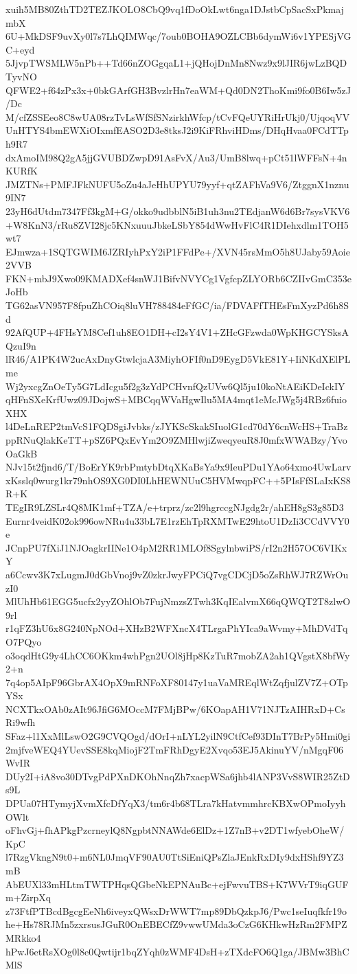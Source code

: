 xuih5MB80ZthTD2TEZJKOLO8CbQ9vq1fDoOkLwt6nga1DJstbCpSacSxPkmajmbX
6U+MkDSF9uvXy0l7s7LhQIMWqc/7oub0BOHA9OZLCBb6dymWi6v1YPESjVGC+eyd
5JjvpTWSMLW5nPb++Td66nZOGgqaL1+jQHojDnMn8Nwz9x9lJIR6jwLzBQDTyvNO
QFWE2+f64zPx3x+0bkGArfGH3BvzlrHn7eaWM+Qd0DN2ThoKmi9fo0B6Iw5zJ/Dc
M/cfZSSEeo8C8wUA08rzTvLsWfSfSNzirkhWfcp/tCvFQeUYRiHrUkj0/UjqoqVV
UnHTYS4bmEWXiOIxmfEASO2D3e8tksJ2i9KiFRhviHDms/DHqHvaa0FCdTTph9R7
dxAmoIM98Q2gA5jjGVUBDZwpD91AsFvX/Au3/UmB8lwq+pCt51lWFFsN+4nKURfK
JMZTNs+PMFJFkNUFU5oZu4aJeHhUPYU79yyf+qtZAFhVa9V6/ZtggnX1nznu9IN7
23yH6dUtdm7347Ff3kgM+G/okko9udbblN5iB1uh3nu2TEdjanW6d6Br7sysVKV6
+W8KnN3/rRu8ZVI28jc5KNxuuuJbkeLSbY854dWwHvFlC4R1DIehxdlm1TOH5wt7
EJmwza+1SQTGWIM6JZRIyhPxY2iP1FFdPe+/XVN45rsMmO5h8UJaby59Aoie2VVB
FKN+mbJ9Xwo09KMADXef4snWJ1BifvNVYCg1VgfcpZLYORb6CZIIvGmC353eJoHb
TG62asVN957F8fpuZhCOiq8luVH788484eFfGC/ia/FDVAFfTHEsFmXyzPd6h8Sd
92AfQUP+4FHsYM8Cef1uh8EO1DH+cI2sY4V1+ZHcGFzwda0WpKHGCYSksAQzuI9n
lR46/A1PK4W2ucAxDnyGtwlcjaA3MiyhOFIf0nD9EygD5VkE81Y+IiNKdXElPLme
Wj2yxcgZnOeTy5G7LdIcgu5f2g3zYdPCHvnfQzUVw6Ql5ju10koNtAEiKDeIckIY
qHFnSXeKrfUwz09JDojwS+MBCqqWVaHgwIlu5MA4mqt1eMcJWg5j4RBz6fuioXHX
l4DeLnREP2tmVcS1FQDSgiJvbks/zJYKScSkakSIuolG1cd70dY6cnWcHS+TraBz
ppRNuQlakKeTT+pSZ6PQxEvYm2O9ZMHlwjiZweqyeuR8J0mfxWWABzy/YvoOaGkB
NJv15t2fjnd6/T/BoErYK9rbPmtybDtqXKaBsYa9x9IeuPDu1YAo64xmo4UwLarv
xKsslq0wurg1kr79nhOS9XG0DI0LhHEWNUuC5HVMwqpFC++5PIsFfSLaIxKS8R+K
TEgIR9LZSLr4Q8MK1mf+TZA/e+trprz/zc2l9hgrccgNJgdg2r/ahEH8gS3g85D3
Eurnr4veidK02ok996owNRu4u33bL7E1rzEhTpRXMTwE29htoU1DzIi3CCdVVY0e
JCnpPU7fXiJ1NJOagkrIINe1O4pM2RR1MLOf8SgylnbwiPS/rI2n2H57OC6VIKxY
a6Ccwv3K7xLugmJ0dGbVnoj9vZ0zkrJwyFPCiQ7vgCDCjD5oZsRhWJ7RZWrOuzI0
MlUhHb61EGG5ucfx2yyZOhlOb7FujNmzsZTwh3KqIEalvmX66qQWQT2T8zlwO9rl
r1qFZ3hU6x8G240NpNOd+XHzB2WFXncX4TLrgaPhYIca9aWvmy+MhDVdTqO7PQyo
o3oqdHtG9y4LhCC6OKkm4whPgn2UOl8jHp8KzTuR7mobZA2ah1QVgstX8bfWy2+n
7q4op5AIpF96GbrAX4OpX9mRNFoXF80147y1uaVaMREqlWtZqfjulZV7Z+OTpYSx
NCXTkxOAb0zAIt96JfiG6MOccM7FMjBPw/6KOapAH1V71NJTzAIHRxD+CsRi9wfh
SFaz+l1XxMlLswO2G9CVQOgd/dOrI+nLYL2yilN9CtfCef93DInT7BrPy5Hmi0gi
2mjfveWEQ4YUevSSE8kqMiojF2TmFRhDgyE2Xvqo53EJ5AkinuYV/nMgqF06WvIR
DUy2I+iA8vo30DTvgPdPXnDKOhNnqZh7xacpWSa6jhb4lANP3VvS8WIR25ZtDs9L
DPUa07HTymyjXvmXfcDfYqX3/tm6r4b68TLra7kHatvmmhrcKBXwOPmoIyyhOWlt
oFhvGj+fhAPkgPzcrneylQ8NgpbtNNAWde6ElDz+1Z7nB+v2DT1wfyebOheW/KpC
l7RzgVkngN9t0+m6NL0JmqVF90AU0TtSiEniQPsZlaJEnkRxDIy9dxHShf9YZ3mB
AbEUXl33mHLtmTWTPHqsQGbeNkEPNAuBc+ejFwvuTBS+K7WVrT9iqGUFm+ZirpXq
z73FtfPTBcdBgcgEeNh6iveyxQWsxDrWWT7mp89DbQzkpJ6/Pwc1seIuqfkfr19o
he+Hs78RJMn5zxrsusJGuR0OnEBECfZ9vwwUMda3oCzG6KHkwHzRm2FMPZMRkko4
hPwJ6etRsXOg0l8e0Qwtijr1bqZYqh0zWMF4DsH+zTXdcFO6Q1ga/JBMw3BhCMlS
